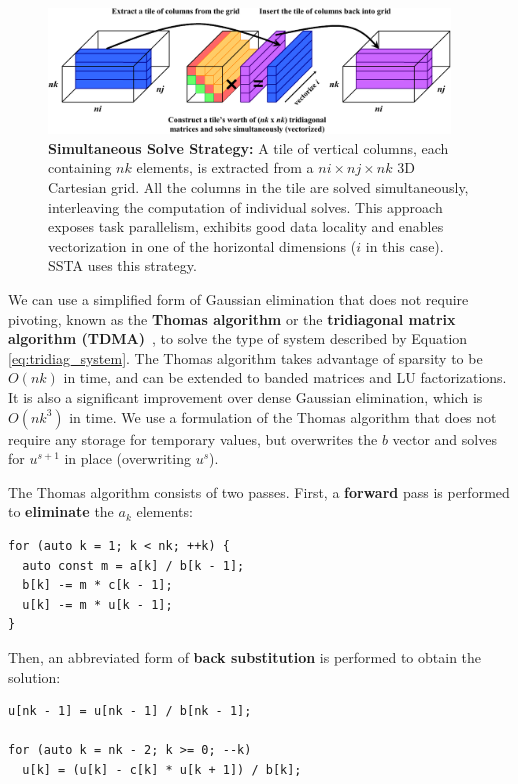 \documentclass[10pt, conference, compsocconf]{IEEEtran}
\begin{document}
\begin{figure}[!bth]
  \centering
  \caption{\small
    \textbf{Simultaneous Solve Strategy:} A tile of vertical columns, each 
      containing \(nk\) elements, is extracted from a \(ni \times nj \times nk\)
      3D Cartesian grid.
    All the columns in the tile are solved simultaneously, interleaving 
      the computation of individual solves.
    This approach exposes task parallelism, exhibits good data locality and
      enables vectorization in one of the horizontal dimensions (\(i\) in this
      case).
    SSTA uses this strategy.
  }
  \label{fig:impl:batching:sim_strat}
  \includegraphics[width=0.95\textwidth]{figures/batching/simultaneous_solve_diagram.pdf}
\end{figure}

We can use a simplified form of Gaussian elimination that does not require
  pivoting, known as the \textbf{Thomas algorithm} or the \textbf{tridiagonal
  matrix algorithm (TDMA)}~\cite{elem_numerical_analysis_conte}, to
  solve the type of system described by Equation \ref{eq:tridiag_system}.
The Thomas algorithm takes advantage of sparsity to be \(O(nk)\) in time, 
  and can be extended to banded matrices and LU factorizations.
It is also a significant improvement over dense Gaussian elimination,
  which is \(O(nk^3)\) in time. 
We use a formulation of the Thomas algorithm that does not require any storage
  for temporary values, but overwrites the \(b\) vector and solves for
  \(u^{s+1}\) in place (overwriting \(u^{s}\)).

The Thomas algorithm consists of two passes.  First, a \textbf{forward} pass is
  performed to \textbf{eliminate} the \(a_k\) elements:
\begin{lstlisting}
for (auto k = 1; k < nk; ++k) {
  auto const m = a[k] / b[k - 1];
  b[k] -= m * c[k - 1];
  u[k] -= m * u[k - 1];
} 
\end{lstlisting}
Then, an abbreviated form of \textbf{back substitution} is performed to obtain
  the solution:
\begin{lstlisting}
u[nk - 1] = u[nk - 1] / b[nk - 1];

for (auto k = nk - 2; k >= 0; --k) 
  u[k] = (u[k] - c[k] * u[k + 1]) / b[k];
\end{lstlisting}
\end{document}

